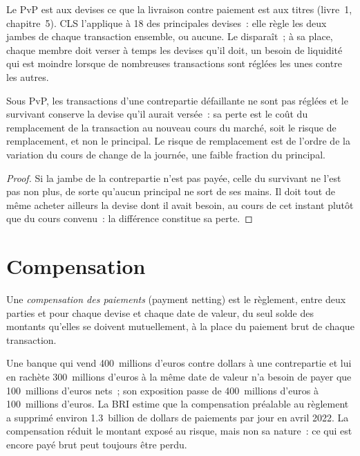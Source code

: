 Le PvP est aux devises ce que la livraison contre paiement est aux titres
(livre~1, chapitre~5). CLS l'applique à 18 des principales devises~: elle règle
les deux jambes de chaque transaction ensemble, ou aucune. Le  disparaît~;
à sa place, chaque membre doit verser à temps les devises qu'il doit, un besoin de liquidité
qui est moindre lorsque de nombreuses transactions sont réglées les unes contre les autres.

\begin{proposition}\label{prop:m2:settlement-risk:pvp}
Sous PvP, les transactions d'une contrepartie défaillante ne sont pas réglées et le survivant conserve
la devise qu'il aurait versée~: sa perte est le coût du remplacement de la transaction au
nouveau cours du marché, soit le risque de remplacement, et non le principal. Le risque de remplacement est
de l'ordre de la variation du cours de change de la journée, une faible fraction du principal.
\end{proposition}

\begin{proof}
Si la jambe de la contrepartie n'est pas payée, celle du survivant ne l'est pas non plus, de sorte
qu'aucun principal ne sort de ses mains. Il doit tout de même acheter ailleurs la devise dont il avait besoin, au
cours de cet instant plutôt que du cours convenu~: la différence constitue sa perte.
\end{proof}

\section{Compensation}

\begin{definition}\label{def:m2:settlement-risk:netting}
Une \emph{compensation des paiements} (payment netting) est le règlement, entre deux
parties et pour chaque devise et chaque date de valeur, du seul solde des montants qu'elles
se doivent mutuellement, à la place du paiement brut de chaque transaction.
\end{definition}

Une banque qui vend 400~millions d'euros contre dollars à une contrepartie et lui en rachète
300~millions d'euros à la même date de valeur n'a besoin de payer que 100~millions d'euros nets~;
son exposition passe de 400~millions d'euros à 100~millions d'euros. La BRI estime
que la compensation préalable au règlement a supprimé environ 1.3~billion de dollars de paiements par jour en
avril 2022. La compensation réduit le montant exposé au risque, mais non sa nature~: ce qui est encore payé brut peut
toujours être perdu.

